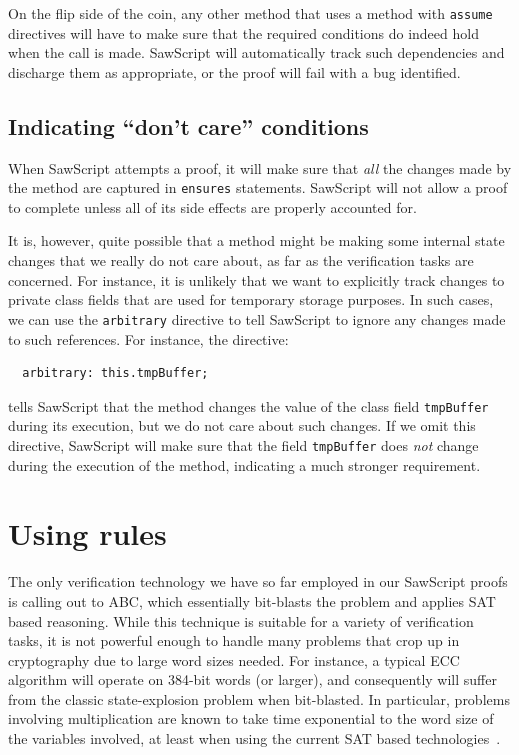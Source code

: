 \documentclass[12pt]{galois-whitepaper}
\newcommand{\sawScript}{{\sc SawScript}\xspace}
\begin{document}
On the flip side of the coin,
any other method that uses a method with {\tt assume} directives will have to make sure that the required conditions do indeed hold when the call is made.
\sawScript will automatically track such dependencies and discharge them as appropriate, or the proof will fail with a bug identified.

\subsection{Indicating ``don't care'' conditions}

When \sawScript attempts a proof, it will make sure that {\em all} the changes made by the method are captured in {\tt ensures} statements. \sawScript
will not allow a proof to complete unless all of its side effects are properly accounted for.

It is, however, quite possible that a method
might be making some internal state changes that we really do not care about, as far as the verification tasks are concerned. For instance,
it is unlikely that we want to explicitly track changes to private class fields that are used for temporary storage purposes.
In such cases, we can use the {\tt arbitrary} directive to tell \sawScript to ignore any changes made to such references. For instance, the directive:
\begin{Verbatim}
  arbitrary: this.tmpBuffer;
\end{Verbatim}
tells \sawScript that the method changes the value of the class field {\tt tmpBuffer} during
its execution, but we do not care about such changes. If we omit this directive,
\sawScript will make sure that the field {\tt tmpBuffer} does {\em not} change during the execution of the method,
indicating a much stronger requirement.

\section{Using rules}\label{sec:rules}

The only verification technology we have so far employed in our \sawScript proofs is calling out to ABC, which essentially bit-blasts the problem
and applies SAT based reasoning. While this technique is suitable for a variety of verification tasks, it is not powerful enough to handle many
problems that crop up in cryptography due to large word sizes needed. For instance, a typical ECC algorithm will operate on 384-bit
words (or larger), and consequently will suffer from the classic state-explosion problem when bit-blasted. In particular, problems involving
multiplication are known to take time exponential to the word size of the variables involved, at least when using the current
SAT based technologies~\cite[Section 6.3.1]{DecisionProcedures2008}.
\end{document}
